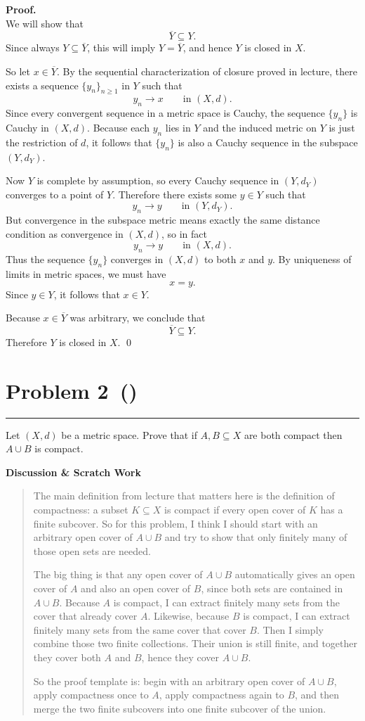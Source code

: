 \documentclass[12pt]{article}
\makeatletter
\newenvironment{scratch}{%
  \par\smallskip
  \noindent\textbf{Discussion \& Scratch Work}\begin{quote}\small
}{%
  \end{quote}\smallskip
}
\newcommand{\problem}[2][]{%
  \def\prob@title{Problem #2\if\relax\detokenize{#1}\relax\else\ (\textit{#1})\fi}%
  \phantomsection%
  \pdfbookmark[1]{\prob@title}{prob#2}%
  \addcontentsline{toc}{section}{\prob@title}%
  \section*{\prob@title}%
  \vspace{-0.25em}\hrule\vspace{0.8em}%
}
\makeatother
\begin{document}
\textbf{Proof.}\\
We will show that
\[
\overline{Y}\subseteq Y.
\]
Since always $Y\subseteq \overline{Y}$, this will imply $Y=\overline{Y}$, and hence $Y$ is closed in $X$.

So let $x\in \overline{Y}$. By the sequential characterization of closure proved in lecture, there exists a sequence $\{y_n\}_{n\ge 1}$ in $Y$ such that
\[
y_n\to x
\qquad \text{in } (X,d).
\]
Since every convergent sequence in a metric space is Cauchy, the sequence $\{y_n\}$ is Cauchy in $(X,d)$. Because each $y_n$ lies in $Y$ and the induced metric on $Y$ is just the restriction of $d$, it follows that $\{y_n\}$ is also a Cauchy sequence in the subspace $(Y,d_Y)$.

Now $Y$ is complete by assumption, so every Cauchy sequence in $(Y,d_Y)$ converges to a point of $Y$. Therefore there exists some $y\in Y$ such that
\[
y_n\to y
\qquad \text{in } (Y,d_Y).
\]
But convergence in the subspace metric means exactly the same distance condition as convergence in $(X,d)$, so in fact
\[
y_n\to y
\qquad \text{in } (X,d).
\]
Thus the sequence $\{y_n\}$ converges in $(X,d)$ to both $x$ and $y$. By uniqueness of limits in metric spaces, we must have
\[
x=y.
\]
Since $y\in Y$, it follows that $x\in Y$.

Because $x\in \overline{Y}$ was arbitrary, we conclude that
\[
\overline{Y}\subseteq Y.
\]
Therefore $Y$ is closed in $X$.
\qed

\newpage

\problem[]{2}
Let $(X,d)$ be a metric space. Prove that if $A,B\subseteq X$ are both compact
then $A\cup B$ is compact.

\begin{scratch}
The main definition from lecture that matters here is the definition of compactness: a subset $K\subseteq X$ is compact if every open cover of $K$ has a finite subcover. So for this problem, I think I should start with an arbitrary open cover of $A\cup B$ and try to show that only finitely many of those open sets are needed.

The big thing is that any open cover of $A\cup B$ automatically gives an open cover of $A$ and also an open cover of $B$, since both sets are contained in $A\cup B$. Because $A$ is compact, I can extract finitely many sets from the cover that already cover $A$. Likewise, because $B$ is compact, I can extract finitely many sets from the same cover that cover $B$. Then I simply combine those two finite collections. Their union is still finite, and together they cover both $A$ and $B$, hence they cover $A\cup B$.

So the proof template is: begin with an arbitrary open cover of $A\cup B$, apply compactness once to $A$, apply compactness again to $B$, and then merge the two finite subcovers into one finite subcover of the union.
\end{scratch}
\end{document}
